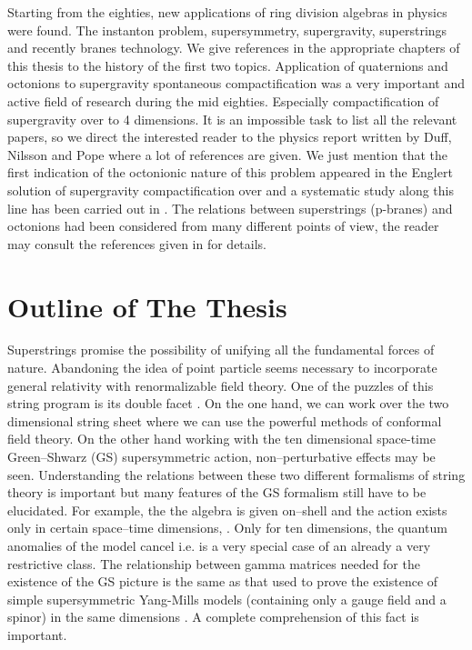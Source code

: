 \documentclass[a4paper,12pt]{book}
\begin{document}
Starting from the eighties, new applications of ring division algebras in
physics were found. The instanton problem, supersymmetry, supergravity,
superstrings and recently branes technology. We give references in the
appropriate chapters of this thesis to the history of the first two topics.
Application of quaternions and octonions to supergravity spontaneous
compactification was a very important and active field of research during
the mid eighties. Especially compactification of \coordHE{} supergravity over \coordHE{} to 4 dimensions. It is an impossible task to list all the relevant
papers, so we direct the interested reader to the physics report \cite
{duffpope} written by Duff, Nilsson and Pope where a lot of references are
given. We just mention that the first indication of the octonionic nature of
this problem appeared in the Englert solution of \coordHE{} supergravity
compactification over \coordHE{}\cite{englert} and a systematic study along
this line has been carried out in \cite{rom}\cite{grutze}\cite{tukersudbery}%
\cite{dewittnicol}. The relations between superstrings (p-branes) and
octonions had been considered from many different points of view, the reader
may consult the references given in \cite{duff} for details.\newpage

\section{Outline of The Thesis}

Superstrings promise the possibility of unifying all the fundamental forces
of nature. Abandoning the idea of point particle seems necessary to
incorporate general relativity with renormalizable field theory. One of the
puzzles of this string program is its double facet \cite{gsw}\cite{polsh}.
On the one hand, we can work over the two dimensional string sheet where we
can use the powerful methods of conformal field theory. On the other hand
working with the ten dimensional space-time Green--Shwarz (GS)
supersymmetric action, non--perturbative effects may be seen. Understanding
the relations between these two different formalisms of string theory is
important but many features of the GS formalism still have to be elucidated.
For example, the the algebra is given on--shell and the action exists only
in certain space--time dimensions, \coordHE{}. Only for ten dimensions,
the quantum anomalies of the model cancel i.e. \coordHE{} is a very special case
of an already a very restrictive class. The relationship between gamma
matrices needed for the existence of the GS picture is the same as that used
to prove the existence of simple supersymmetric Yang-Mills models
(containing only a gauge field and a spinor) in the same dimensions \coordHE{} \cite{r0}. A complete comprehension of this fact is important.
\end{document}
